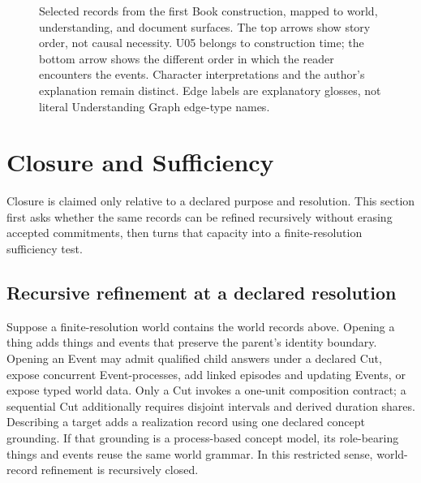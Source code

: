 \documentclass[11pt,a4paper]{article}
\begin{document}
\begin{figure}[!htbp]
\caption{Selected records from the first Book construction, mapped to world,
understanding, and document surfaces. The top arrows show story order, not
causal necessity. U05 belongs to construction time; the bottom arrow shows
the different order in which the reader encounters the events. Character
interpretations and the author's explanation remain distinct. Edge labels
are explanatory glosses, not literal Understanding Graph edge-type names.}
\label{fig:book-succession}
\end{figure}

\section{Closure and Sufficiency}
\label{sec:closure}

Closure is claimed only relative to a declared purpose and resolution. This
section first asks whether the same records can be refined recursively without
erasing accepted commitments, then turns that capacity into a finite-resolution
sufficiency test.

\subsection{Recursive refinement at a declared resolution}

Suppose a finite-resolution world contains the world records above. Opening
a thing adds things and events that preserve the parent's identity boundary.
Opening an Event may admit qualified child answers under a declared Cut, expose
concurrent Event-processes, add linked episodes and updating Events, or expose
typed world data. Only a Cut invokes a one-unit composition contract; a sequential Cut
additionally requires disjoint intervals and derived duration shares.
Describing a target adds a realization record using one declared concept
grounding. If that grounding is a process-based concept model, its role-bearing things and
events reuse the same world grammar. In this restricted sense, world-record
refinement is recursively closed.
\end{document}
